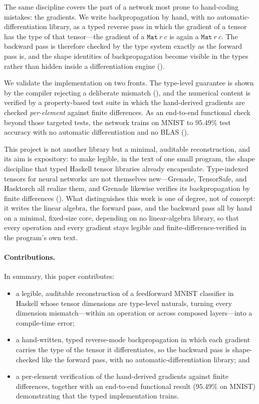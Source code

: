 \documentclass[sigconf,nonacm]{acmart}
\begin{document}
The same discipline covers the part of a network most prone to hand-coding
mistakes: the gradients. We write backpropagation by hand, with no
automatic-differentiation library, as a typed reverse pass in which the gradient
of a tensor has the type of that tensor---the gradient of a $\mathtt{Mat}\ r\ c$
is again a $\mathtt{Mat}\ r\ c$. The backward pass is therefore checked by the
type system exactly as the forward pass is, and the shape identities of
backpropagation become visible in the types rather than hidden inside a
differentiation engine ().

We validate the implementation on two fronts. The type-level guarantee is shown
by the compiler rejecting a deliberate mismatch (), and the
numerical content is verified by a property-based test suite in which the
hand-derived gradients are checked \emph{per-element} against finite
differences. As an end-to-end functional check beyond those targeted tests, the
network trains on MNIST to $95.49\%$ test accuracy with no automatic
differentiation and no BLAS ().

This project is not another library but a minimal, auditable reconstruction, and
its aim is expository: to make legible, in the text of one small program, the
shape discipline that typed Haskell tensor libraries already encapsulate.
Type-indexed tensors for neural networks are not themselves new---Grenade,
TensorSafe, and Hasktorch all realize them, and Grenade likewise verifies its
backpropagation by finite differences (). What distinguishes
this work is one of degree, not of concept: it writes the linear algebra, the
forward pass, and the backward pass all by hand on a minimal, fixed-size core,
depending on no linear-algebra library, so that every operation and every
gradient stays legible and finite-difference-verified in the program's own
text.

\paragraph{Contributions.}
In summary, this paper contributes:
\begin{itemize}
  \item a legible, auditable reconstruction of a feedforward MNIST classifier in
    Haskell whose tensor dimensions are type-level naturals, turning every
    dimension mismatch---within an operation or across composed layers---into a
    compile-time error;
  \item a hand-written, typed reverse-mode backpropagation in which each gradient
    carries the type of the tensor it differentiates, so the backward pass is
    shape-checked like the forward pass, with no automatic-differentiation
    library; and
  \item a per-element verification of the hand-derived gradients
    against finite differences, together with an end-to-end functional result
    ($95.49\%$ on MNIST) demonstrating that the typed implementation trains.
\end{itemize}
\end{document}
